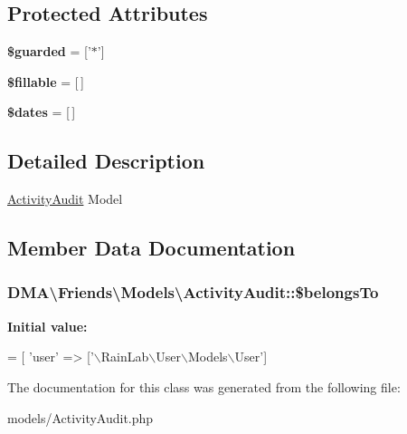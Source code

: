 \subsection*{Protected Attributes}
\begin{DoxyCompactItemize}
\item 
\hypertarget{classDMA_1_1Friends_1_1Models_1_1ActivityAudit_a56c4af485fb857b9d362db13739368bb}{{\bfseries \$guarded} = \mbox{[}'$\ast$'\mbox{]}}\label{classDMA_1_1Friends_1_1Models_1_1ActivityAudit_a56c4af485fb857b9d362db13739368bb}

\item 
\hypertarget{classDMA_1_1Friends_1_1Models_1_1ActivityAudit_a03d666e47cec485d0bcfe8b39de3ba62}{{\bfseries \$fillable} = \mbox{[}$\,$\mbox{]}}\label{classDMA_1_1Friends_1_1Models_1_1ActivityAudit_a03d666e47cec485d0bcfe8b39de3ba62}

\item 
\hypertarget{classDMA_1_1Friends_1_1Models_1_1ActivityAudit_aa67694d5194ad2aec8ce67e840a8ad8e}{{\bfseries \$dates} = \mbox{[}$\,$\mbox{]}}\label{classDMA_1_1Friends_1_1Models_1_1ActivityAudit_aa67694d5194ad2aec8ce67e840a8ad8e}

\end{DoxyCompactItemize}


\subsection{Detailed Description}
\hyperlink{classDMA_1_1Friends_1_1Models_1_1ActivityAudit}{Activity\+Audit} Model 

\subsection{Member Data Documentation}
\hypertarget{classDMA_1_1Friends_1_1Models_1_1ActivityAudit_a2507a01682db7fb43bf7906d8a982031}{
\subsubsection[{\$belongs\+To}]{\setlength{\rightskip}{0pt plus 5cm}D\+M\+A\textbackslash{}\+Friends\textbackslash{}\+Models\textbackslash{}\+Activity\+Audit\+::\$belongs\+To}}\label{classDMA_1_1Friends_1_1Models_1_1ActivityAudit_a2507a01682db7fb43bf7906d8a982031}
{\bfseries Initial value\+:}
\begin{DoxyCode}
= [
        \textcolor{stringliteral}{'user'}      => [\textcolor{stringliteral}{'\(\backslash\)RainLab\(\backslash\)User\(\backslash\)Models\(\backslash\)User'}]
\end{DoxyCode}


The documentation for this class was generated from the following file\+:\begin{DoxyCompactItemize}
\item 
models/Activity\+Audit.\+php\end{DoxyCompactItemize}
